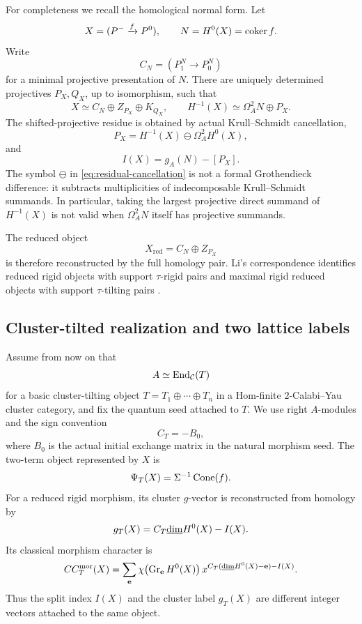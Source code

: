 For completeness we recall the homological normal form.  Let
\[
 X=(P^-\xrightarrow fP^0),
 \qquad N=H^0(X)=\operatorname{coker} f.
\]
Write
\[
 C_N=(P_1^N\longrightarrow P_0^N)
\]
for a minimal projective presentation of $N$.  There are uniquely determined
projectives $P_X,Q_X$, up to isomorphism, such that
\begin{equation}
 X\simeq C_N\oplus Z_{P_X}\oplus K_{Q_X},
 \qquad
 H^{-1}(X)\simeq\Omega_A^2N\oplus P_X.
 \label{eq:homology-normal-form}
\end{equation}
The shifted-projective residue is obtained by actual Krull--Schmidt
cancellation,
\begin{equation}
 P_X=H^{-1}(X)\ominus\Omega_A^2H^0(X),
 \label{eq:residual-cancellation}
\end{equation}
and
\begin{equation}
 I(X)=g_A(N)-[P_X].
 \label{eq:index-homology}
\end{equation}
The symbol $\ominus$ in \cref{eq:residual-cancellation} is not a formal
Grothendieck difference: it subtracts multiplicities of indecomposable
Krull--Schmidt summands.  In particular, taking the largest projective direct
summand of $H^{-1}(X)$ is not valid when $\Omega_A^2N$ itself has projective
summands.

The reduced object
\[
 X_{\mathrm{red}}=C_N\oplus Z_{P_X}
\]
is therefore reconstructed by the full homology pair.  Li's correspondence
identifies reduced rigid objects with support $\tau$-rigid pairs and maximal
rigid reduced objects with support $\tau$-tilting pairs \cite{Li,AIR}.

\subsection{Cluster-tilted realization and two lattice labels}

Assume from now on that
\[
 A\simeq\operatorname{End}_{\mathcal C}(T)
\]
for a basic cluster-tilting object $T=T_1\oplus\cdots\oplus T_n$ in a
Hom-finite $2$-Calabi--Yau cluster category, and fix the quantum seed attached
to $T$.  We use right $A$-modules and the sign convention
\[
 C_T=-B_0,
\]
where $B_0$ is the actual initial exchange matrix in the natural morphism
seed.  The two-term object represented by $X$ is
\[
 \Psi_T(X)=\Sigma^{-1}\operatorname{Cone}(f).
\]
For a reduced rigid morphism, its cluster $g$-vector is reconstructed from
homology by
\begin{equation}
 g_T(X)=C_T\underline{\dim} H^0(X)-I(X).
 \label{eq:cluster-g-homology}
\end{equation}
Its classical morphism character is
\begin{equation}
 CC_T^{\mathrm{mor}}(X)
 =\sum_{\mathbf e}
   \chi\!\left(\operatorname{Gr}_{\mathbf e}H^0(X)\right)
   x^{C_T(\underline{\dim} H^0(X)-\mathbf e)-I(X)}.
 \label{eq:morphism-character}
\end{equation}
Thus the split index $I(X)$ and the cluster label $g_T(X)$ are different
integer vectors attached to the same object.

